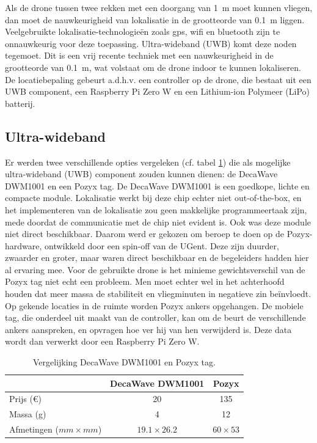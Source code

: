 Als de drone tussen twee rekken met een doorgang van \SI{1}{\m} moet kunnen vliegen, dan moet de nauwkeurigheid van lokalisatie in de grootteorde van \SI{0.1}{\m} liggen.
Veelgebruikte lokalisatie-technologieën zoals gps, wifi en bluetooth zijn te onnauwkeurig voor deze toepassing.
Ultra-wideband (UWB) komt deze noden tegemoet.
Dit is een vrij recente techniek met een nauwkeurigheid in de grootteorde van \SI{0.1}{\m}, wat volstaat om de drone indoor te kunnen lokaliseren.
De locatiebepaling gebeurt a.d.h.v. een controller op de drone, die bestaat uit een UWB component, een Raspberry Pi Zero W en een Lithium-ion Polymeer (LiPo) batterij.\\

\subsection{Ultra-wideband} \label{sec:uwb}
Er werden twee verschillende opties vergeleken (cf. tabel \ref{tab:decavspozyx}) die als mogelijke ultra-wideband (UWB) component zouden kunnen dienen: de DecaWave DWM1001 en een Pozyx tag.
De DecaWave DWM1001 is een goedkope, lichte en compacte module. Lokalisatie werkt bij deze chip echter niet out-of-the-box, en het implementeren van de lokalisatie zou geen makkelijke programmeertaak zijn, mede doordat de communicatie met de chip niet evident is.
Ook was deze module niet direct beschikbaar.
Daarom werd er gekozen om beroep te doen op de Pozyx-hardware, ontwikkeld door een spin-off van de UGent.
Deze zijn duurder, zwaarder en groter, maar waren direct beschikbaar en de begeleiders hadden hier al ervaring mee.
Voor de gebruikte drone is het minieme gewichtsverschil van de Pozyx tag niet echt een probleem. Men moet echter wel in het achterhoofd houden dat meer massa de stabiliteit en vliegminuten in negatieve zin beïnvloedt.\\

Op gekende locaties in de ruimte worden Pozyx ankers opgehangen.
De mobiele tag, die onderdeel uit maakt van de controller, kan om de beurt de verschillende ankers aanspreken, en opvragen hoe ver hij van hen verwijderd is.
Deze data wordt dan verwerkt door een Raspberry Pi Zero W.
\begin{table}[p]
	\centering
	\begin{tabular}{ | l | c | c | } \hline
		& DecaWave DWM1001 & Pozyx \\
		\hline 
		\hline
		Prijs (\euro{}) & 20 & 135 \\ 
		\hline
		Massa (g) & 4 & 12 \\ 
		\hline
		Afmetingen ($mm \times mm$) & $19.1 \times 26.2$ & $60 \times 53$ \\ 
		\hline
	\end{tabular}
	\caption[Vergelijking DecaWave DWM1001 en Pozyx tag]{Vergelijking DecaWave DWM1001 en Pozyx tag.}
	\label{tab:decavspozyx}
\end{table}

